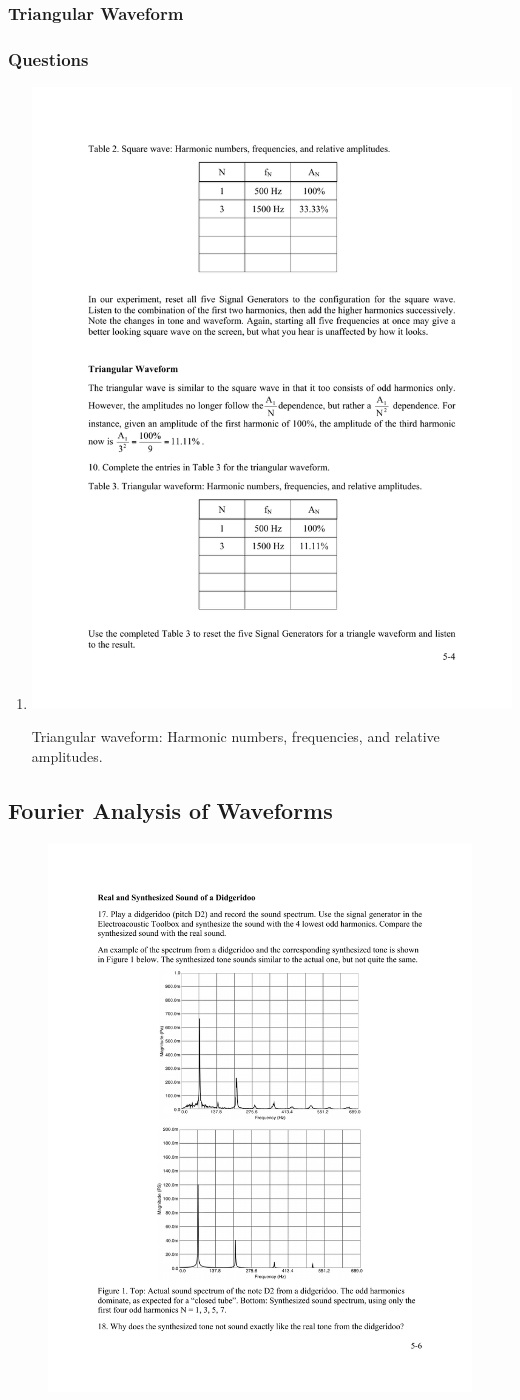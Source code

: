 \documentclass[11pt]{NSF}
\def\ben{\begin{enumerate}}
\def\een{\end{enumerate}}
\def\i{\item{}}
\begin{document}
\subsubsection{Triangular Waveform}

\subsubsection*{Questions}

\ben
\i 
%
\begin{table}[hbtp]
\begin{center}
\includegraphics[width=.35\textwidth]{tab5_3}
\caption{Triangular waveform: Harmonic numbers, frequencies, and relative amplitudes.}
\label{t:3}
\end{center}
\end{table}
%
\een

\subsection{Fourier Analysis of Waveforms}


%
\begin{figure}[hbtp]
\begin{center}
\includegraphics[width=.7\textwidth]{fig5_1}
\caption{}
\label{f:} 
\end{center} 
\end{figure}
%
\end{document}
